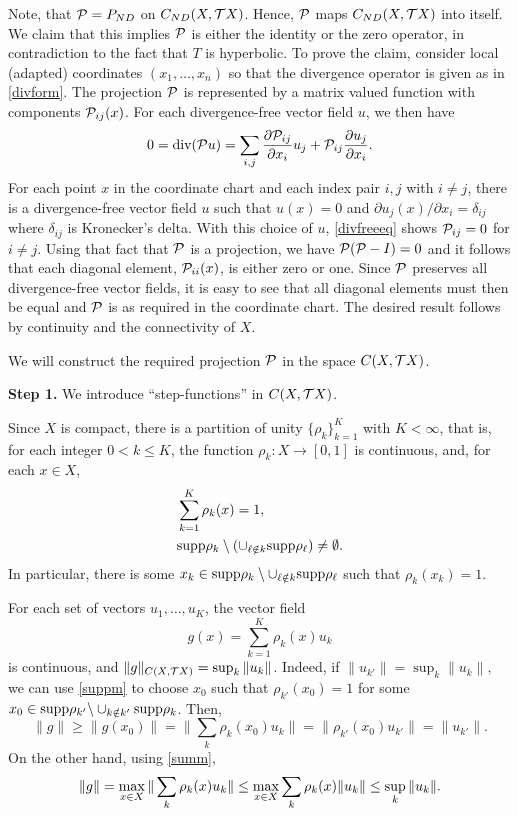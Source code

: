 \begin{pf}
Note, that ${\cal{P}}=P_{ND}$ on $C_{ND}(X,{{\cal{T}}X})$.   Hence,
${\cal{P}}$ maps $C_{ND}(X,{{\cal{T}}X})$ into itself.
We claim that
this implies ${\cal{P}}$ is either the identity or the zero
operator, in contradiction to the fact that $T$ is hyperbolic.
To prove the claim, consider local (adapted) coordinates
$(x_1,\ldots,x_n)$ so that
the divergence operator is given as in \eqref{divform}.
The projection ${\cal{P}}$ is represented by a matrix valued
function with components ${\cal{P}}_{ij}(x)$. For each divergence-free
vector field $u$, we then have
\begin{equation}
\label{divfreeeq}
0=\hbox{\rm div}( {\cal{P}} u)=\sum_{i,j}\frac{\partial{\cal{P}}_{ij}}{\partial
x_i}u_j +{\cal{P}}_{ij}\frac{\partial u_{j}}{\partial x_i}.
\end{equation}
For each point $x$ in the coordinate chart and each index pair
${i,j}$ with $i\ne j$, there is a divergence-free
vector field $u$ such that $u(x)=0$ and
$\partial u_{j}(x)/{\partial x_i}=\delta_{ij}$ where $\delta_{ij}$
is Kronecker's delta. With this choice of $u$, \eqref{divfreeeq}
shows ${\cal{P}}_{ij}=0$ for $i\neq j$.
 Using that fact that ${\cal{P}}$ is a projection, we
have ${\cal{P}}({\cal{P}}-I)=0$ and it follows that each diagonal element,
${\cal{P}}_{ii}(x)$, is either
zero or  one. Since ${\cal{P}}$ preserves all
divergence-free vector fields, it is easy to see that all diagonal
elements must then be equal  and ${\cal{P}}$ is as required in the coordinate
chart. The desired result follows by continuity and the connectivity
of $X$.

We will construct the required projection ${\cal{P}}$ in the space ${C(X,{{\cal{T}}X})}$.

{\bf Step 1.} We introduce ``step-functions'' in ${C(X,{{\cal{T}}X})}$.

Since $X$ is compact, there is a partition of unity
$\{\displaystyle \rho_k\}^{K}_{k=1}$ with $K<\infty$, that is,
for each integer  $0<k\le K$, the function $\rho_k:X\to [0,1]$ is
continuous, and, for each $x\in X$,
\begin{eqnarray}
& \sum^{K}_{k=1} \rho_k (x) = 1, \label{summ}\\
& \hbox{\rm supp}  \rho_k\setminus
(\cup\sb{\ell \notin k} \hbox{\rm supp} \rho_{\ell})
\neq \emptyset. \label{suppm}
\end{eqnarray}
In particular, there is some
$x_k\in\hbox{\rm supp}  \rho_k\setminus\cup\sb{\ell \notin k} \hbox{\rm supp} \rho_{\ell}$
such that $\rho_k(x_k)=1$.

For each set of  vectors  $u_1,\ldots,u_K$,
the vector field
\[g(x)=\sum^{K}_{k=1} \rho_k(x) u_k\]
is  continuous, and $\|g\|_{C(X,{{\cal{T}}X})} =
\sup_k \| u_k \|$.
Indeed, if $\| u_{k'}\| = \sup_k \| u_k\|,$
we can use \eqref{suppm} to choose $x_0$
such that $\rho_{k'}(x_0) =1$ for some
$x_0\in \hbox{\rm supp} \rho_{k'}\backslash \cup\sb{k\notin k'} \hbox{\rm supp} \rho_k$.
Then,
$$
\| g\| \ge \| g(x_0) \|=\| \sum_k \rho_k
(x_0) u_k\|=\| \rho_{k'} (x_0)
u_{k'}\|=\|u_{k'}\|.
$$
On the other hand, using \eqref{summ},
\begin{equation*}
\|g\|  = \max\sb{x\in X} \| \sum_k \rho_k (x)u_k \|
\le \max\sb{x\in X} \sum_k
\rho_k (x) \| u_k\| \le \sup_k \| u_k \|.
\end{equation*}


\end{pf}
